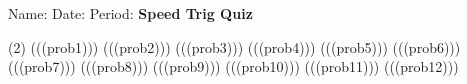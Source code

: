 \documentclass{minimal}
\begin{document}
\noindent Name:\underline{\hspace{5cm}}\hspace{1.25cm}
Date:\underline{\hspace{3cm}}\hspace{1.25cm}
Period:\underline{\hspace{1cm}}
\vspace{15pt}
\newline\textbf{Speed Trig Quiz}\vspace{15pt}
\begin{tasks}(2)
	\task (((prob1)))
	\task (((prob2)))
	\task (((prob3)))
	\task (((prob4)))
	\task (((prob5)))
	\task (((prob6)))
	\task (((prob7)))
	\task (((prob8)))
	\task (((prob9)))
	\task (((prob10)))
	\task (((prob11)))
	\task (((prob12)))
\end{tasks}
\end{document}
